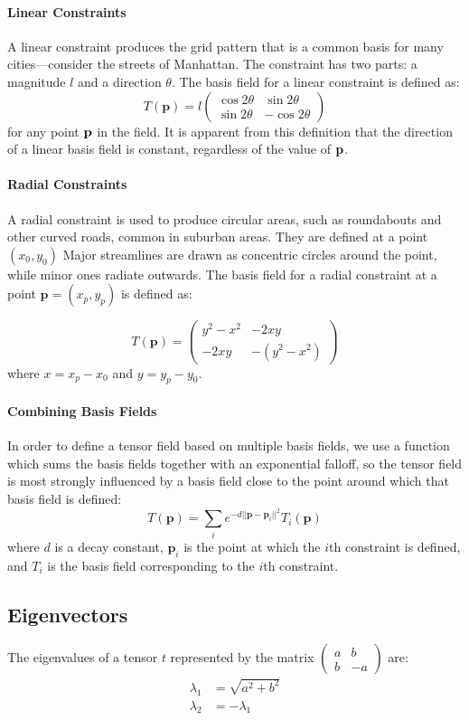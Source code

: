 \documentclass[twocolumn]{article}
\newcommand{\sqmat}[4]{\ensuremath{
    \left(\begin{array}{cc}
        #1 & #2 \\
        #3 & #4
    \end{array}\right)}}
\newcommand{\pt}{\textbf{p}}
\begin{document}
\paragraph{Linear Constraints}
A linear constraint produces the grid pattern that is a common basis for many
cities---consider the streets of Manhattan. The constraint has two parts: a
magnitude $l$ and a direction $\theta$. The basis field for a linear constraint
is defined as:
\[
    T(\pt) =
        l\sqmat{\cos{2\theta}}{\sin{2\theta}}{\sin{2\theta}}{-\cos{2\theta}}
\]
for any point $\bf p$ in the field. It is apparent from this definition that
the direction of a linear basis field is constant, regardless of the value of
$\bf p$.

\paragraph{Radial Constraints}
A radial constraint is used to produce circular areas, such as roundabouts and
other curved roads, common in suburban areas. They are defined at a point
$(x_0,y_0)$ Major streamlines are drawn as concentric circles around the point,
while minor ones radiate outwards. The basis field for a radial constraint at a
point $\pt=(x_p,y_p)$ is defined as:

\[
    T(\pt) = \sqmat{y^2-x^2}{-2xy}{-2xy}{-(y^2-x^2)}
\]
where $x=x_p-x_0$ and $y=y_p-y_0$.

\paragraph{Combining Basis Fields}
In order to define a tensor field based on multiple basis fields, we use a
function which sums the basis fields together with an exponential falloff,
so the tensor field is most strongly influenced by a basis field close to
the point around which that basis field is defined:
\[
    T(\pt) = \sum_i e^{-d||\pt-\pt_i||^2}T_i(\pt)
\]
where $d$ is a decay constant, $\pt_i$ is the point at which the $i$th
constraint is defined, and $T_i$ is the basis field corresponding to the $i$th
constraint.

\subsection{Eigenvectors}\label{sec:eigenvectors}
The eigenvalues of a tensor $t$ represented by the matrix $\sqmat{a}{b}{b}{-a}$
are:
\begin{align*}
    \lambda_1 &= \sqrt{a^2+b^2} \\
    \lambda_2 &= -\lambda_1
\end{align*}
\end{document}
